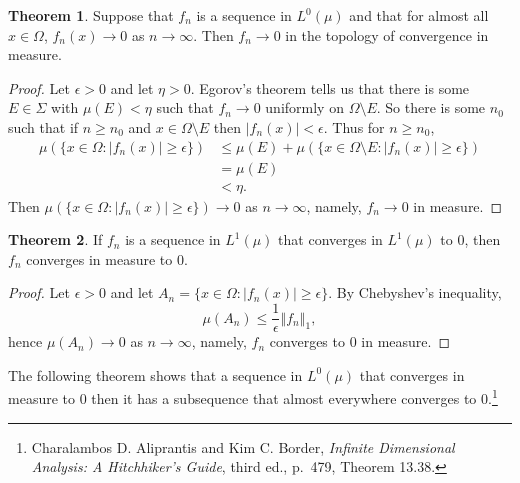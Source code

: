 \documentclass{article}
\newcommand{\norm}[1]{\left\Vert #1 \right\Vert}
\theoremstyle{definition}
\newtheorem{theorem}{Theorem}
\theoremstyle{definition}
\begin{document}
\begin{theorem}
Suppose that $f_n$ is a sequence in $L^0(\mu)$ and that for  almost all $x \in \Omega$,
$f_n(x) \to 0$ as $n \to \infty$. Then $f_n \to 0$ in the topology of convergence in measure.
\end{theorem}
\begin{proof}
Let $\epsilon>0$ and let $\eta>0$. Egorov's theorem tells us that there is some $E \in \Sigma$ with
$\mu(E)<\eta$  such that
$f_n \to 0$ uniformly on $\Omega \setminus E$.
So there is some $n_0$ such that if  
 $n \geq n_0$ and $x \in \Omega \setminus E$ then
$|f_n(x)|<\epsilon$. 
Thus for $n \geq n_0$,
\begin{align*}
\mu(\{x \in \Omega: |f_n(x)| \geq \epsilon\})&\leq \mu(E)+
\mu(\{x \in \Omega \setminus E: |f_n(x)| \geq \epsilon\})\\
&=\mu(E)\\
&<\eta.
\end{align*}
Then $\mu(\{x \in \Omega: |f_n(x)| \geq \epsilon\}) \to 0$ as $n \to \infty$, namely, 
$f_n \to 0$ in measure.
\end{proof}

\begin{theorem}
If $f_n$ is a sequence in $L^1(\mu)$  that converges in $L^1(\mu)$ to $0$, then
$f_n$ converges in measure to $0$.
\end{theorem}
\begin{proof}
Let $\epsilon>0$ and let $A_n=\{x \in \Omega: |f_n(x)| \geq \epsilon\}$.
By Chebyshev's inequality,
\[
\mu(A_n) \leq \frac{1}{\epsilon} \norm{f_n}_1,
\]
hence $\mu(A_n) \to 0$ as $n \to \infty$, namely, $f_n$ converges to $0$ in measure.
\end{proof}


The following theorem shows that a sequence in $L^0(\mu)$ that converges in measure to $0$
then it has a subsequence that almost everywhere converges to  $0$.\footnote{Charalambos D. 
Aliprantis and Kim C. Border, {\em Infinite Dimensional Analysis: A Hitchhiker's Guide}, third ed., p.~479,
Theorem 13.38.} 
\end{document}
